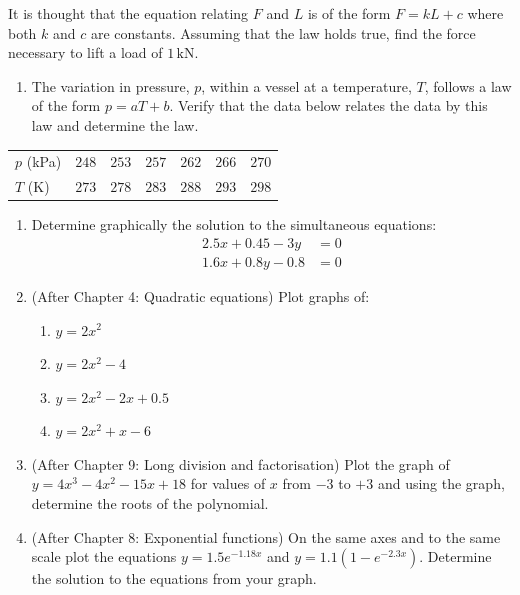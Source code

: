 \documentclass[
  12pt,
  oneside]{book}
\providecommand{\tightlist}{%
  \setlength{\itemsep}{0pt}\setlength{\parskip}{0pt}}
\theoremstyle{definition}
\theoremstyle{definition}
\theoremstyle{definition}
\theoremstyle{definition}
\theoremstyle{remark}
\begin{document}
It is thought that the equation relating \(F\) and \(L\) is of the form \(F = kL + c\) where both \(k\) and \(c\) are constants. Assuming that the law holds true, find the force necessary to lift a load of \(1\,\mathrm{kN}\).

\begin{enumerate}
\def\labelenumi{\arabic{enumi}.}
\setcounter{enumi}{2}
\tightlist
\item
  The variation in pressure, \(p\), within a vessel at a temperature, \(T\), follows a law of the form \(p = aT + b\). Verify that the data below relates the data by this law and determine the law.
\end{enumerate}

\begin{longtable}[]{@{}
  >{\raggedright\arraybackslash}p{}
  >{\raggedright\arraybackslash}p{}
  >{\raggedright\arraybackslash}p{}
  >{\raggedright\arraybackslash}p{}
  >{\raggedright\arraybackslash}p{}
  >{\raggedright\arraybackslash}p{}
  >{\raggedright\arraybackslash}p{}@{}}
\toprule()
\endhead
\(p\) (kPa) & \(248\) & \(253\) & \(257\) & \(262\) & \(266\) & \(270\) \\
\(T\) (K) & \(273\) & \(278\) & \(283\) & \(288\) & \(293\) & \(298\) \\
\bottomrule()
\end{longtable}

\begin{enumerate}
\def\labelenumi{\arabic{enumi}.}
\setcounter{enumi}{3}
\item
  Determine graphically the solution to the simultaneous equations:
  \begin{align*}
  2.5x + 0.45 - 3y &= 0\\
  1.6x + 0.8y - 0.8 &= 0
  \end{align*}
\item
  (After Chapter 4: Quadratic equations) Plot graphs of:

  \begin{enumerate}
  \def\labelenumii{\roman{enumii})}
  \tightlist
  \item
    \(y = 2x^2\)
  \item
    \(y = 2x^2 - 4\)
  \item
    \(y = 2x^2 - 2x + 0.5\)
  \item
    \(y = 2x^2 + x - 6\)
  \end{enumerate}
\item
  (After Chapter 9: Long division and factorisation) Plot the graph of \(y = 4x^3 - 4x^2 - 15x + 18\) for values of \(x\) from \(-3\) to \(+3\) and using the graph, determine the roots of the polynomial.
\item
  (After Chapter 8: Exponential functions) On the same axes and to the same scale plot the equations \(y = 1.5e^{-1.18x}\) and \(y = 1.1(1 - e^{-2.3x})\). Determine the solution to the equations from your graph.
\end{enumerate}
\end{document}
